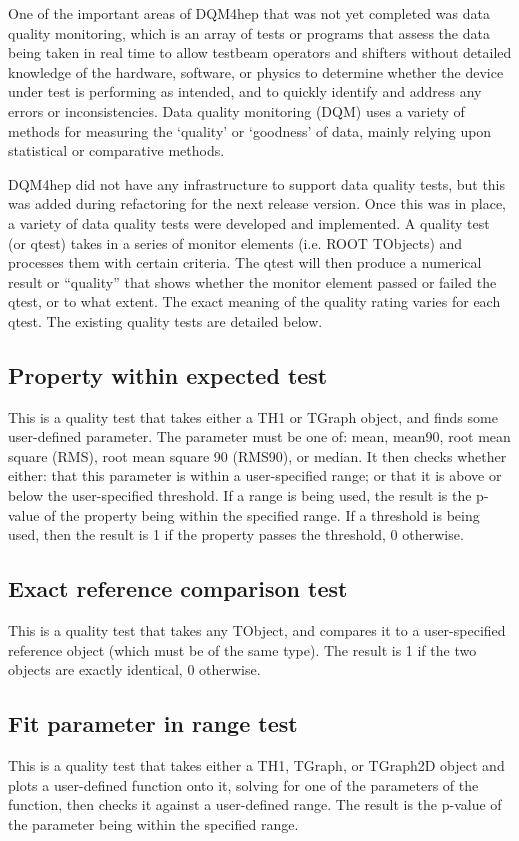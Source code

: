 One of the important areas of DQM4hep that was not yet completed was data quality monitoring, which is an array of tests or programs that assess the data being taken in real time to allow testbeam operators and shifters without detailed knowledge of the hardware, software, or physics to determine whether the device under test is performing as intended, and to quickly identify and address any errors or inconsistencies. Data quality monitoring (DQM) uses a variety of methods for measuring the `quality' or `goodness' of data, mainly relying upon statistical or comparative methods.

DQM4hep did not have any infrastructure to support data quality tests, but this was added during refactoring for the next release version. Once this was in place, a variety of data quality tests were developed and implemented. A quality test (or qtest) takes in a series of monitor elements (i.e. ROOT TObjects) and processes them with certain criteria. The qtest will then produce a numerical result or ``quality'' that shows whether the monitor element passed or failed the qtest, or to what extent. The exact meaning of the quality rating varies for each qtest. The existing quality tests are detailed below.

\subsection{Property within expected test}
This is a quality test that takes either a TH1 or TGraph object, and finds some user-defined parameter. The parameter must be one of: mean, mean90, root mean square (RMS), root mean square 90 (RMS90), or median. It then checks whether either: that this parameter is within a user-specified range; or that it is above or below the user-specified threshold. If a range is being used, the result is the p-value of the property being within the specified range. If a threshold is being used, then the result is 1 if the property passes the threshold, 0 otherwise.

\subsection{Exact reference comparison test}
This is a quality test that takes any TObject, and compares it to a user-specified reference object (which must be of the same type). The result is 1 if the two objects are exactly identical, 0 otherwise. 

\subsection{Fit parameter in range test}
This is a quality test that takes either a TH1, TGraph, or TGraph2D object and plots a user-defined function onto it, solving for one of the parameters of the function, then checks it against a user-defined range. The result is the p-value of the parameter being within the specified range.

